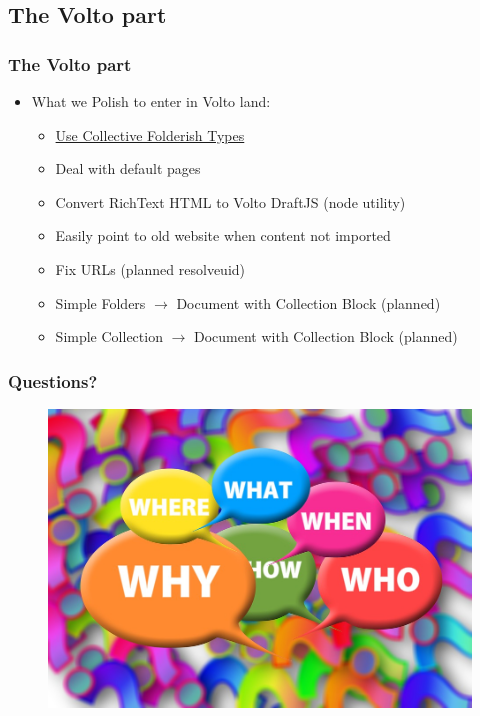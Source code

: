 \documentclass[aspectratio=169]{beamer}
\begin{document}
\subsection{The Volto part}
\begin{frame}
  \frametitle{The Volto part}
  \begin{itemize}
    \item What we Polish to enter in Volto land:
    \begin{itemize}
      \item \href{https://github.com/collective/collective.folderishtypes}{Use Collective Folderish Types} \pause
      \item Deal with default pages \pause
      \item Convert RichText HTML to Volto DraftJS (node utility) \pause
      \item Easily point to old website when content not imported \pause
      \item Fix URLs (planned resolveuid) \pause
      \item Simple Folders $\rightarrow$ Document with Collection Block (planned) \pause
      \item Simple Collection $\rightarrow$ Document with Collection Block (planned)
    \end{itemize}
  \end{itemize}
\end{frame}

\begin{frame}
  \frametitle{Questions?}
  \begin{figure}
    \includegraphics[height=.7\textheight]{./img/010_-_questions.jpg}
  \end{figure}
\end{frame}
\end{document}
